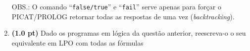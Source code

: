 \documentclass[11pt, a4paper,final]{article}
\begin{document}
\begin{enumerate}
\vskip 0.3cm

OBS.: O comando ``\texttt{false/true}'' e ``\texttt{fail}'' serve apenas para forçar o PICAT/PROLOG retornar todas as respostas de uma vez ({\em backtracking}).


\item {\bf (1.0 pt)} Dado os programas em lógica da questão anterior, reescreva-o o seu equivalente
em LPO com todas as fórmulas %




  



\end{enumerate}
\end{document}
